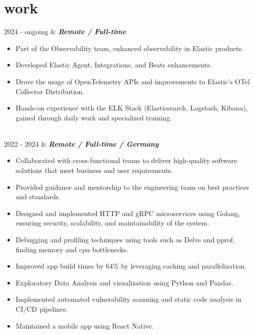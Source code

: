 \documentclass[]{cv-mauri}
\begin{document}
\section*{work}
\begin{tabularcv}
	2024 - ongoing   &   
				\textbf{\textit{Remote / Full-time}}

		\begin{itemize}
			\item Part of the Observability team, enhanced observability in Elastic products.
			\item Developed Elastic Agent, Integrations, and Beats enhancements.
			\item Drove the usage of OpenTelemetry APIs and improvements to Elastic's OTel Collector Distribution.
			\item Hands-on experience with the ELK Stack (Elasticsearch, Logstash, Kibana), gained through daily work and specialized training.
		\end{itemize}
				\\[\vspacepar]
	2022 - 2024   &   
					\textbf{\textit{Remote / Full-time / Germany}}

			\begin{itemize}
				\item Collaborated with cross-functional teams to deliver high-quality software solutions that meet business and user requirements.
				\item Provided guidance and mentorship to the engineering team on best practices and standards.
				\item Designed and implemented HTTP and gRPC microservices using Golang, ensuring security, scalability, and maintainability of the system.
				\item Debugging and profiling techniques using tools such as Delve and pprof, finding memory and cpu bottlenecks.
				\item Improved app build times by 64\% by leveraging caching and parallelization.
				\item Exploratory Data Analysis and visualization using Python and Pandas.
				\item Implemented automated vulnerability scanning and static code analysis in CI/CD pipelines.
				\item Maintained a mobile app using React Native.
			\end{itemize}
					\\[\vspacepar]


\end{tabularcv}
\end{document}
